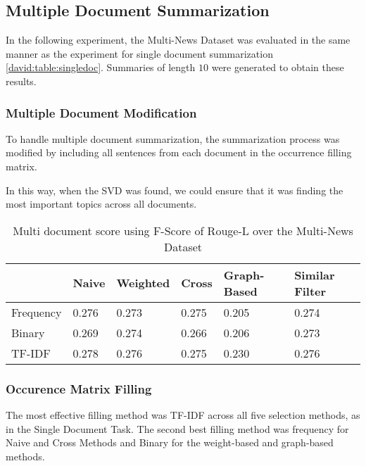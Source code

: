 \documentclass[../writeup.tex]{subfiles}
\begin{document}
\subsection{Multiple Document Summarization}\label{david:sec:experiments:multidocument}

In the following experiment, the Multi-News Dataset was evaluated in the same manner as the experiment for single document summarization \ref{david:table:singledoc}. Summaries of length $10$ were generated to obtain these results.


\subsubsection{Multiple Document Modification}\label{david:sec:experiments:multidocument:modification}

To handle multiple document summarization, the summarization process was modified by including all sentences from each document in the occurrence filling matrix.

In this way, when the SVD was found, we could ensure that it was finding the most important topics across all documents.



\begin{table}
    \centering
    \begin{tabular}{l l l l l l }
        \hline
                  & Naive & Weighted & Cross & Graph-Based & Similar Filter \\ \hline
        Frequency & 0.276 & 0.273    & 0.275 & 0.205       & 0.274          \\
        Binary    & 0.269 & 0.274    & 0.266 & 0.206       & 0.273          \\
        TF-IDF    & 0.278 & 0.276    & 0.275 & 0.230       & 0.276          \\
    \end{tabular}
    \caption{Multi document score using F-Score of Rouge-L over the Multi-News Dataset}
    \label{david:table:multidoc}
\end{table}

\subsubsection{Occurence Matrix Filling}\label{david:sec:experiments:multidocument:matrix}

The most effective filling method was TF-IDF across all five selection methods, as in the Single Document Task.
The second best filling method was frequency for Naive and Cross Methods and Binary for the weight-based and graph-based methods.
\end{document}

